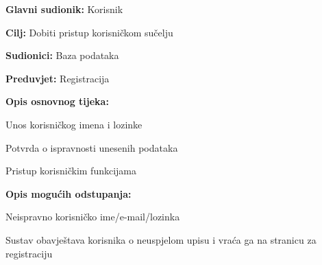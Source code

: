 				    \noindent {}
					\begin{packed_item}
	
						\item \textbf{Glavni sudionik:} Korisnik
						\item  \textbf{Cilj:} Dobiti pristup korisničkom sučelju
						\item  \textbf{Sudionici:} Baza podataka
						\item  \textbf{Preduvjet:} Registracija
						\item  \textbf{Opis osnovnog tijeka:}
						
						\item[] \begin{packed_enum}
	
							\item Unos korisničkog imena i lozinke
							\item Potvrda o ispravnosti unesenih podataka
							\item Pristup korisničkim funkcijama

						\end{packed_enum}
						
						\item  \textbf{Opis mogućih odstupanja:}
						
						\item[] \begin{packed_item}
	
							\item[2.a] Neispravno korisničko ime/e-mail/lozinka
							\item[] \begin{packed_enum}
								
								\item Sustav obavještava korisnika o neuspjelom upisu i vraća ga na stranicu za registraciju
								
							\end{packed_enum}
							
						\end{packed_item}
					\end{packed_item}
					
